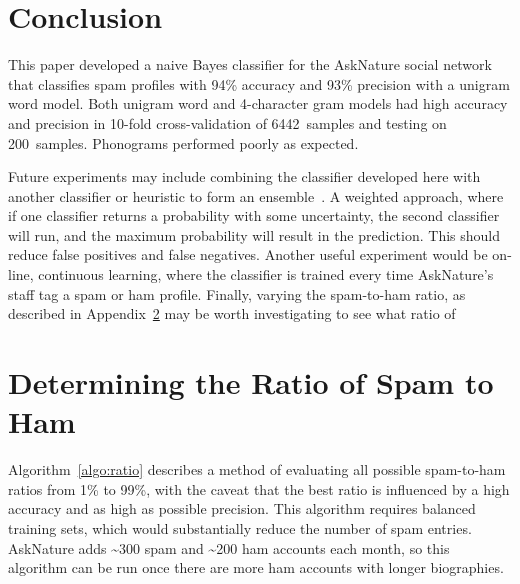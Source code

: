 \documentclass[10pt]{article}
\def \corpusSize {6442}
\def \testSize {200}
\begin{document}
\section{Conclusion}

This paper developed a naive Bayes classifier for the AskNature social
network that classifies spam profiles with 94\% accuracy and 93\% precision
with a unigram word model. Both unigram word and 4-character gram models had
high accuracy and precision in 10-fold cross-validation of \corpusSize\
samples and testing on \testSize\ samples. Phonograms performed poorly as expected.

Future experiments may include combining the classifier developed here with
another classifier or heuristic to form an ensemble~\cite{ensemble}. A
weighted approach, where if one classifier returns a probability with some
uncertainty, the second classifier will run, and the maximum probability will
result in the prediction. This should reduce false positives and false
negatives. Another useful experiment would be on-line, continuous learning,
where the classifier is trained every time AskNature's staff tag a spam or ham
profile. Finally, varying the spam-to-ham ratio, as described in
Appendix~\ref{a:ratio} may be worth investigating to see what ratio of

\appendix
\section{Determining the Ratio of Spam to Ham}
\label{a:ratio}

Algorithm~\ref{algo:ratio} describes a method of evaluating all possible
spam-to-ham ratios from 1\% to 99\%, with the caveat that the best ratio is
influenced by a high accuracy and as high as possible precision. This
algorithm requires balanced training sets, which would substantially reduce
the number of spam entries. AskNature adds \textasciitilde 300 spam and
\textasciitilde 200 ham accounts each month, so this algorithm can be run once
there are more ham accounts with longer biographies.
\end{document}
